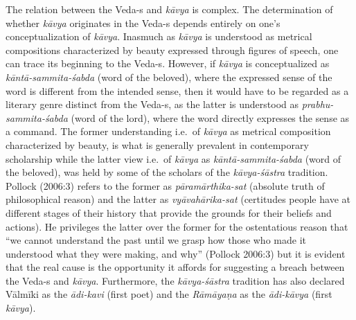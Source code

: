 The relation between the Veda-s and \textsl{kāvya} is complex. The determination of whether \textsl{kāvya} originates in the Veda-s depends entirely on one's conceptualization of \textsl{kāvya}. Inasmuch as \textsl{kāvya} is understood as metrical compositions characterized by beauty expressed through figures of speech, one can trace its beginning to the Veda-s. However, if \textsl{kāvya} is conceptualized as \textsl{kāntā-sammita-śabda} (word of the beloved), where the expressed sense of the word is different from the intended sense, then it would have to be regarded as a literary genre distinct from the Veda-s, as the latter is understood as \textsl{prabhu-sammita-śabda} (word of the lord), where the word directly expresses the sense as a command. The former understanding i.e.\ of \textsl{kāvya} as metrical composition characterized by beauty, is what is generally prevalent in contemporary scholarship while the latter view i.e.\ of \textsl{kāvya} as \textsl{kāntā-sammita-śabda} (word of the beloved), was held by some of the scholars of the \textsl{kāvya-śāstra} tradition. Pollock (2006:3) refers to the former as \textsl{pāramārthika-sat} (absolute truth of philosophical reason) and the latter as \textsl{vyāvahārika-sat} (certitudes people have at different stages of their history that provide the grounds for their beliefs and actions). He privileges the latter over the former for the ostentatious reason that ``we cannot understand the past until we grasp how those who made it understood what they were making, and why'' (Pollock 2006:3) but it is evident that the real cause is the opportunity it affords for suggesting a breach between the \hbox{Veda-s} and \textsl{kāvya}. Furthermore, the \textsl{kāvya-śāstra} tradition has also declared Vālmīki as the \textsl{ādi-kavi} (first poet) and the \textsl{Rāmāyaṇa} as the \textsl{ādi-kāvya} (first \textsl{kāvya}).

